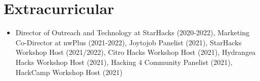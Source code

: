 \documentclass[a4paper,11pt]{article}
\newcommand{\resumeItem}[1]{
	\item\small{
		{#1 \vspace{-2pt}}
	}
}
\newcommand{\resumeItemListStart}{\begin{itemize}\OpenSansRegular}
\newcommand{\resumeItemListEnd}{\end{itemize}\vspace{-5pt}}
\begin{document}


\section{Extracurricular}
\resumeItemListStart
\resumeItem{
	Director of Outreach and Technology at StarHacks {\OpenSansItalic(2020-2022)},
	Marketing Co-Director at nwPlus {\OpenSansItalic(2021-2022)},
	Joytojob Panelist {\OpenSansItalic(2021)},
	StarHacks Workshop Host {\OpenSansItalic(2021/2022)},
	Citro Hacks Workshop Host {\OpenSansItalic(2021)},
	Hydrangea Hacks Workshop Host {\OpenSansItalic(2021)},
	Hacking 4 Community Panelist {\OpenSansItalic(2021)},
	HackCamp Workshop Host {\OpenSansItalic(2021)}
}
\resumeItemListEnd

\end{document}
